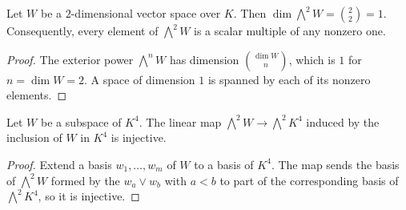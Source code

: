 \begin{lemma}
  \label{lem:complement-iso-line-one-dim}
  \leanok
  Let $W$ be a $2$-dimensional vector space over $K$. Then
  $\dim \bigwedge^{2} W = \binom{2}{2} = 1$. Consequently, every element
  of $\bigwedge^{2} W$ is a scalar multiple of any nonzero one.
\end{lemma}
\begin{proof}
  \leanok
  The exterior power $\bigwedge^{n} W$ has dimension
  $\binom{\dim W}{n}$, which is $1$ for $n = \dim W = 2$. A space of
  dimension $1$ is spanned by each of its nonzero elements.
\end{proof}

\begin{lemma}
  \label{lem:complement-iso-exterior-map-injective}
  \leanok
  Let $W$ be a subspace of $K^4$. The linear map
  $\bigwedge^{2} W \to \bigwedge^{2} K^4$ induced by the inclusion of $W$
  in $K^4$ is injective.
\end{lemma}
\begin{proof}
  \leanok
  Extend a basis $w_1, \dots, w_m$ of $W$ to a basis of $K^4$. The map
  sends the basis of $\bigwedge^2 W$ formed by the $w_a \vee w_b$ with
  $a < b$ to part of the corresponding basis of $\bigwedge^2 K^4$, so it
  is injective.
\end{proof}

